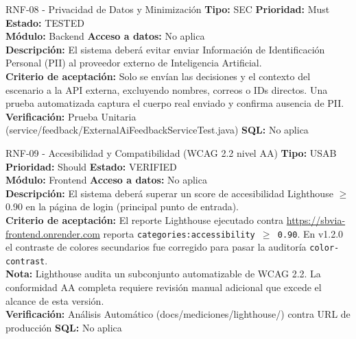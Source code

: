 \documentclass[11pt,a4paper]{article}
\begin{document}
\begin{requisito}{RNF-08 - Privacidad de Datos y Minimización}
    \textbf{Tipo:} SEC \quad \textbf{Prioridad:} Must \quad \textbf{Estado:} TESTED \\[0.2cm]
    \textbf{Módulo:} Backend \quad \textbf{Acceso a datos:} No aplica \\[0.2cm]
    \textbf{Descripción:} El sistema deberá evitar enviar Información de Identificación Personal (PII) al proveedor externo de Inteligencia Artificial. \\[0.2cm]
    \textbf{Criterio de aceptación:} Solo se envían las decisiones y el contexto del escenario a la API externa, excluyendo nombres, correos o IDs directos. Una prueba automatizada captura el cuerpo real enviado y confirma ausencia de PII. \\[0.2cm]
    \textbf{Verificación:} Prueba Unitaria (service/feedback/ExternalAiFeedbackServiceTest.java) \quad \textbf{SQL:} No aplica
\end{requisito}

\begin{requisito}{RNF-09 - Accesibilidad y Compatibilidad (WCAG 2.2 nivel AA)}
    \textbf{Tipo:} USAB \quad \textbf{Prioridad:} Should \quad \textbf{Estado:} VERIFIED \\[0.2cm]
    \textbf{Módulo:} Frontend \quad \textbf{Acceso a datos:} No aplica \\[0.2cm]
    \textbf{Descripción:} El sistema deberá superar un score de accesibilidad Lighthouse $\geq$ 0.90 en la página de login (principal punto de entrada). \\[0.2cm]
    \textbf{Criterio de aceptación:} El reporte Lighthouse ejecutado contra \url{https://sbvia-frontend.onrender.com} reporta \texttt{categories:accessibility $\geq$ 0.90}. En v1.2.0 el contraste de colores secundarios fue corregido para pasar la auditoría \texttt{color-contrast}. \\[0.2cm]
    \textbf{Nota:} Lighthouse audita un subconjunto automatizable de WCAG 2.2. La conformidad AA completa requiere revisión manual adicional que excede el alcance de esta versión. \\[0.2cm]
    \textbf{Verificación:} Análisis Automático (docs/mediciones/lighthouse/) contra URL de producción \quad \textbf{SQL:} No aplica
\end{requisito}
\end{document}
